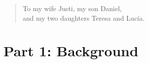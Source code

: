 \documentclass[11pt,fleqn]{book} %
\begin{document}
\newpage\null\thispagestyle{empty}\newpage

\newpage
\thispagestyle{empty}

\begin{quote}
\begin{flushright}
To my wife Justi, my son Daniel, \\
and my two daughters Teresa and Lucía.
\end{flushright}
\end{quote}




\pagestyle{empty} %

\tableofcontents %



\cleardoublepage %

\pagestyle{fancy} %

%
%



%
%



%
%
%
%

\part{\label{part:Background}Part 1: Background}


%
%



%
%

% 


%
%



%
%



%
%
\end{document}
